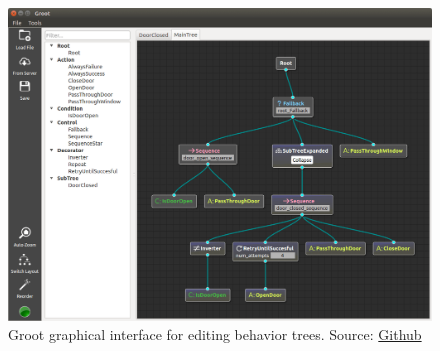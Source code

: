 \begin{figure}[htbp]
    \centering
    \includegraphics[width=1\linewidth]
    {Preliminaries/figures/groot.png}
    \caption{Groot graphical interface for editing behavior trees. Source: \href{https://github.com/BehaviorTree/Groot}{Github}}
    \label{fig:groot}
\end{figure}

\endinput